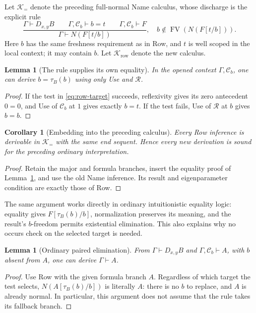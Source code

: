 \documentclass[11pt,letterpaper]{article}
\newtheorem{lemma}[theorem]{Lemma}
\newtheorem{corollary}[theorem]{Corollary}
\theoremstyle{definition}\newtheorem{definition}[theorem]{Definition}
\theoremstyle{remark}\newtheorem{remark}[theorem]{Remark}
\begin{document}
Let $\mathcal K_{=}$ denote the preceding full-normal Name calculus,
whose discharge is the explicit rule
\[
 \frac{\Gamma\vdash D_{x,y}B\qquad\Gamma,\mathcal C_b\vdash b=t
       \qquad\Gamma,\mathcal C_b\vdash F}
      {\Gamma\vdash N(F[t/b])},
 \quad b\notin\operatorname{FV}(N(F[t/b])).
 \tag{Name}
\]
Here $b$ has the same freshness requirement as in Row, and $t$ is
well scoped in the local context; it may contain $b$.  Let $\mathcal K_{\mathrm{row}}$ denote the new calculus.

\begin{lemma}[The rule supplies its own equality]
\label{lem:row-selected-equality}
In the opened context $\Gamma,\mathcal C_b$, one can derive
$b=\tau_B(b)$ using only Use and $\mathcal R$.
\end{lemma}
\begin{proof}
If the test in \eqref{eq:row-target} succeeds, reflexivity gives its zero
antecedent $0=0$, and Use of $\mathcal C_b$ at $1$ gives exactly $b=t$.
If the test fails, Use of $\mathcal R$ at $b$ gives $b=b$.
\end{proof}

\begin{corollary}[Embedding into the preceding calculus]
\label{cor:row-soundness}
Every Row inference is derivable in $\mathcal K_{=}$ with the same end
sequent.  Hence every new derivation is sound for the preceding ordinary
interpretation.
\end{corollary}
\begin{proof}
Retain the major and formula branches, insert the equality proof of
Lemma~\ref{lem:row-selected-equality}, and use the old Name inference.
Its result and eigenparameter condition are exactly those of Row.
\end{proof}

The same argument works directly in ordinary intuitionistic equality
logic: equality gives $F[\tau_B(b)/b]$, normalization preserves its
meaning, and the result's $b$-freedom permits existential elimination.
This also explains why no occurs check on the selected target is needed.

\begin{lemma}[Ordinary paired elimination]
\label{lem:row-ordinary-elimination}
From $\Gamma\vdash D_{x,y}B$ and
$\Gamma,\mathcal C_b\vdash A$, with $b$ absent from $A$, one can derive
$\Gamma\vdash A$.
\end{lemma}
\begin{proof}
Use Row with the given formula branch $A$.  Regardless of which target
the test selects, $N(A[\tau_B(b)/b])$ is literally $A$: there is no $b$ to
replace, and $A$ is already normal.  In particular, this argument does
not assume that the rule takes its fallback branch.
\end{proof}
\end{document}
